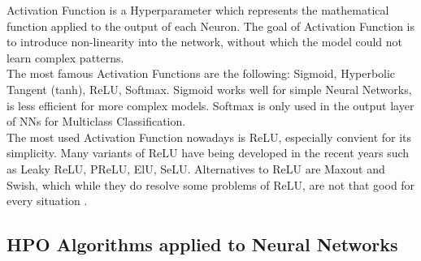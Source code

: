 Activation Function is a Hyperparameter which represents the mathematical function applied to the output of each Neuron.
The goal of Activation Function is to introduce non-linearity into the network, without which the model could not learn complex patterns.
\\[0.3cm]The most famous Activation Functions are the following: Sigmoid, Hyperbolic Tangent (tanh), ReLU, Softmax.
Sigmoid works well for simple Neural Networks, is less efficient for more complex models.
Softmax is only used in the output layer of NNs for Multiclass Classification.
\\[0.3cm]The most used Activation Function nowadays is ReLU, especially convient for its simplicity. Many variants of ReLU have being developed in the recent years such as Leaky ReLU, PReLU, ElU, SeLU.
Alternatives to ReLU are Maxout and Swish, which while they do resolve some problems of ReLU, are not that good for every situation \cite{Tesi-1.9}.

\subsection{HPO Algorithms applied to Neural Networks}

